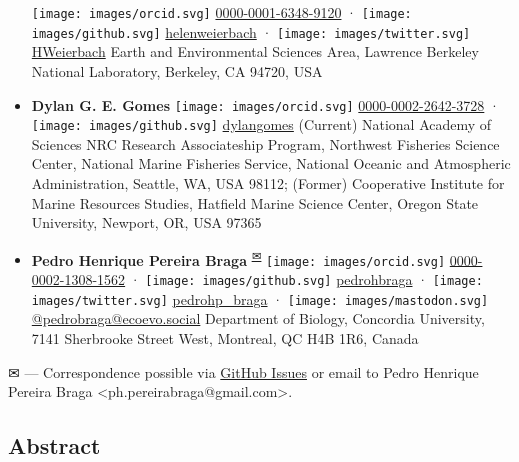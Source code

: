 \begin{itemize}
  \texttt{[image: images/orcid.svg]}
  \href{https://orcid.org/0000-0001-6348-9120}{0000-0001-6348-9120}
  · \texttt{[image: images/github.svg]}
  \href{https://github.com/helenweierbach}{helenweierbach}
  · \texttt{[image: images/twitter.svg]}
  \href{https://twitter.com/HWeierbach}{HWeierbach}
  Earth and Environmental Sciences Area, Lawrence Berkeley National Laboratory, Berkeley, CA 94720, USA
\item
  \textbf{Dylan G. E. Gomes}
  \texttt{[image: images/orcid.svg]}
  \href{https://orcid.org/0000-0002-2642-3728}{0000-0002-2642-3728}
  · \texttt{[image: images/github.svg]}
  \href{https://github.com/dylangomes}{dylangomes}
  (Current) National Academy of Sciences NRC Research Associateship Program, Northwest Fisheries Science Center, National Marine Fisheries Service, National Oceanic and Atmospheric Administration, Seattle, WA, USA 98112; (Former) Cooperative Institute for Marine Resources Studies, Hatfield Marine Science Center, Oregon State University, Newport, OR, USA 97365
\item
  \textbf{Pedro Henrique Pereira Braga}
  \textsuperscript{\protect\hyperlink{correspondence}{✉}}
  \texttt{[image: images/orcid.svg]}
  \href{https://orcid.org/0000-0002-1308-1562}{0000-0002-1308-1562}
  · \texttt{[image: images/github.svg]}
  \href{https://github.com/pedrohbraga}{pedrohbraga}
  · \texttt{[image: images/twitter.svg]}
  \href{https://twitter.com/pedrohp_braga}{pedrohp\_braga}
  · \texttt{[image: images/mastodon.svg]}
  \href{https://ecoevo.social/@pedrobraga}{@pedrobraga@ecoevo.social}
  Department of Biology, Concordia University, 7141 Sherbrooke Street West, Montreal, QC H4B 1R6, Canada
\end{itemize}

\leavevmode{}%
✉ --- Correspondence possible via \href{https://github.com/SORTEE-Github-Hackathon/manuscript/issues}{GitHub Issues}
or email to
Pedro Henrique Pereira Braga \textless ph.pereirabraga@gmail.com\textgreater.

\hypertarget{abstract}{%
\subsection{Abstract}\label{abstract}}

